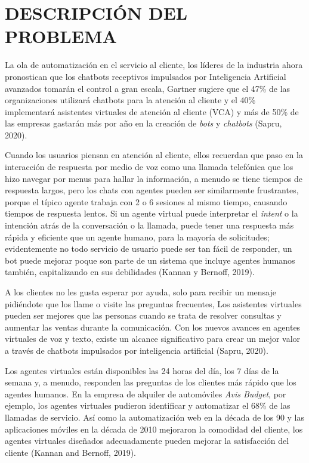 \documentclass[letter, openright, 12pt]{book}
\begin{document}
\section{DESCRIPCIÓN DEL PROBLEMA}

La ola de automatización en el servicio al cliente, los líderes de la industria ahora pronostican que los chatbots receptivos impulsados por Inteligencia Artificial avanzados tomarán el control a gran escala, Gartner sugiere que el 47\% de las organizaciones utilizará chatbots para la atención al cliente y el 40\% implementará asistentes virtuales de atención al cliente (VCA) y más de 50\% de las empresas gastarán más por año en la creación de \textit{bots} y \textit{chatbots} (Sapru, 2020).
\par
Cuando los usuarios piensan en atención al cliente, ellos recuerdan que paso en la interacción de respuesta por medio de voz como una llamada telefónica que los hizo navegar por menus para hallar la información, a menudo se tiene tiempos de respuesta largos, pero los chats con agentes pueden ser similarmente frustrantes, porque el típico agente trabaja con 2 o 6 sesiones al mismo tiempo, causando tiempos de respuesta lentos. Si un agente virtual puede interpretar el \textit{intent} o la intención atrás de la conversación o la llamada, puede tener una respuesta más rápida y eficiente que un agente humano, para la mayoría de solicitudes; evidentemente no todo servicio de usuario puede ser tan fácil de responder, un bot puede mejorar poque son parte de un sistema que incluye agentes humanos también, capitalizando en sus debilidades (Kannan y Bernoff, 2019).
\par 
A los clientes no les gusta esperar por ayuda, solo para recibir un mensaje pidiéndote que los llame o visite las preguntas frecuentes, Los asistentes virtuales pueden ser mejores que las personas cuando se trata de resolver consultas y aumentar las ventas durante la comunicación. Con los nuevos avances en agentes virtuales de voz y texto, existe un alcance significativo para crear un mejor valor a través de chatbots impulsados por inteligencia artificial (Sapru, 2020).
\par 
Los agentes virtuales están disponibles las 24 horas del día, los 7 días de la semana y, a menudo, responden las preguntas de los clientes más rápido que los agentes humanos. En la empresa de alquiler de automóviles \textit{Avis Budget}, por ejemplo, los agentes virtuales pudieron identificar y automatizar el 68\% de las llamadas de servicio. Así como la automatización web en la década de los 90 y las aplicaciones móviles en la década de 2010 mejoraron la comodidad del cliente, los agentes virtuales diseñados adecuadamente pueden mejorar la satisfacción del cliente (Kannan and Bernoff, 2019).
\end{document}
